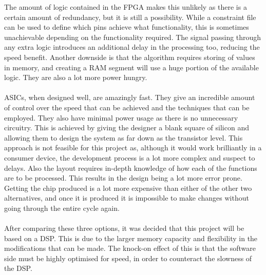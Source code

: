 The amount of logic contained in the FPGA makes this unlikely as there is a certain amount of redundancy, but it is still a possibility.
While a constraint file can be used to define which pins achieve what functionality, this is sometimes unachievable depending on the functionality required.
The signal passing through any extra logic introduces an additional delay in the processing too, reducing the speed benefit.
Another downside is that the algorithm requires storing of values in memory, and creating a RAM segment will use a huge portion of the available logic.
They are also a lot more power hungry.
\\
\\
ASICs, when designed well, are amazingly fast.
They give an incredible amount of control over the speed that can be achieved and the techniques that can be employed.
They also have minimal power usage as there is no unnecessary circuitry.
This is achieved by giving the designer a blank square of silicon and allowing them to design the system as far down as the transistor level.
This approach is not feasible for this project as, although it would work brilliantly in a consumer device, the development process is a lot more complex and suspect to delays.
Also the layout requires in-depth knowledge of how each of the functions are to be processed.
This results in the design being a lot more error prone.
Getting the chip produced is a lot more expensive than either of the other two alternatives, and once it is produced it is impossible to make changes without going through the entire cycle again.
\\
\\
After comparing these three options, it was decided that this project will be based on a DSP.
This is due to the larger memory capacity and flexibility in the modifications that can be made.
The knock-on effect of this is that the software side must be highly optimised for speed, in order to counteract the slowness of the DSP. 
